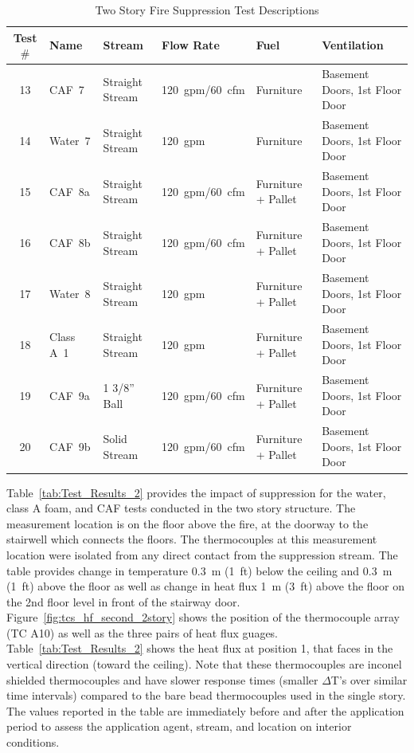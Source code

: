 \documentclass[12pt,oneside]{book}
\begin{document}
\begin{table}[!ht]
\centering
\footnotesize
\caption{Two Story Fire Suppression Test Descriptions}\label{tab:Test_Descriptions_2}
\begin{tabular}{clllll}
\toprule[1.5pt]
Test $\#$  & Name	& Stream			& Flow Rate		& Fuel                    & Ventilation  \\
\midrule
 13  & CAF~7     &  Straight Stream  	&  120~gpm/60~cfm   & Furniture           & Basement Doors, 1st Floor Door \\
 14  & Water~7   &  Straight Stream  	&  120~gpm    		& Furniture           & Basement Doors, 1st Floor Door \\
 15  & CAF~8a    &  Straight Stream  	&  120~gpm/60~cfm   & Furniture + Pallet  & Basement Doors, 1st Floor Door \\
 16  & CAF~8b    &  Straight Stream  	&  120~gpm/60~cfm   & Furniture + Pallet  & Basement Doors, 1st Floor Door \\
 17  & Water~8   &  Straight Stream     &  120~gpm          & Furniture + Pallet  & Basement Doors, 1st Floor Door \\
 18  & Class A~1 &  Straight Stream  	&  120~gpm		    & Furniture + Pallet  & Basement Doors, 1st Floor Door \\
 19  & CAF~9a    &  1 3/8'' Ball    	&  120~gpm/60~cfm   & Furniture + Pallet  & Basement Doors, 1st Floor Door \\
 20  & CAF~9b    &  Solid Stream        &  120~gpm/60~cfm   & Furniture + Pallet  & Basement Doors, 1st Floor Door \\
\bottomrule[1.25pt]
\end{tabular}\par
\end{table}
  
Table~\ref{tab:Test_Results_2} provides the impact of suppression for the water, class A foam, and CAF tests conducted in the two story structure. The measurement location is on the floor above the fire, at the doorway to the stairwell which connects the floors. The thermocouples at this measurement location were isolated from any direct contact from the suppression stream. The table provides change in temperature 0.3~m (1~ft) below the ceiling and 0.3~m (1~ft) above the floor as well as change in heat flux 1~m (3~ft) above the floor on the 2nd floor level in front of the stairway door. Figure~\ref{fig:tcs_hf_second_2story} shows the position of the thermocouple array (TC A10) as well as the three pairs of heat flux guages. Table~\ref{tab:Test_Results_2} shows the heat flux at position 1, that faces in the vertical direction (toward the ceiling). Note that these thermocouples are inconel shielded thermocouples and have slower response times (smaller $\Delta$T's over similar time intervals) compared to the bare bead thermocouples used in the single story. The values reported in the table are immediately before and after the application period to assess the application agent, stream, and location on interior conditions.
\end{document}
